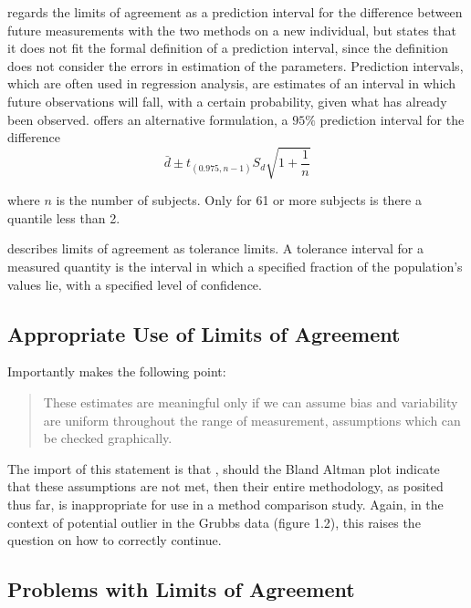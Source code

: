 \documentclass[12pt, a4paper]{report}
\theoremstyle{plain}
\theoremstyle{definition}
\theoremstyle{remark}
\begin{document}
	\citet{BXC2008} regards the limits of agreement as a prediction
	interval for the difference between future measurements with the
	two methods on a new individual, but states that it does not fit
	the formal definition of a prediction interval, since the
	definition does not consider the errors in estimation of the
	parameters. Prediction intervals, which are often used in
	regression analysis, are estimates of an interval in which future
	observations will fall, with a certain probability, given what has
	already been observed. \citet{BXC2008} offers an alternative
	formulation, a $95\%$ prediction interval for the difference
	\begin{equation}
	\bar{d} \pm t_{(0.975, n-1)}S_{d} \sqrt{1+\frac{1}{n}}
	\end{equation}
	
	\noindent where $n$ is the number of subjects. Only for 61 or more
	subjects is there a quantile less than 2.
	
	\citet{luiz} describes limits of agreement as tolerance limits. A
	tolerance interval for a measured quantity is the interval in
	which a specified fraction of the population's values lie, with a
	specified level of confidence.
	
	
	\subsection{Appropriate Use of Limits of Agreement}
	Importantly \citet{BA99} makes the following point:
	\begin{quote}These estimates are meaningful only if we can assume
		bias and variability are uniform throughout the range of
		measurement, assumptions which can be checked graphically.
	\end{quote}
	
	The import of this statement is that , should the Bland Altman
	plot indicate that these assumptions are not met, then their
	entire methodology, as posited thus far, is inappropriate for use
	in a method comparison study. Again, in the context of potential
	outlier in the Grubbs data (figure 1.2), this raises the question
	on how to correctly continue.
	\subsection{Problems with Limits of Agreement}
	
\end{document}
